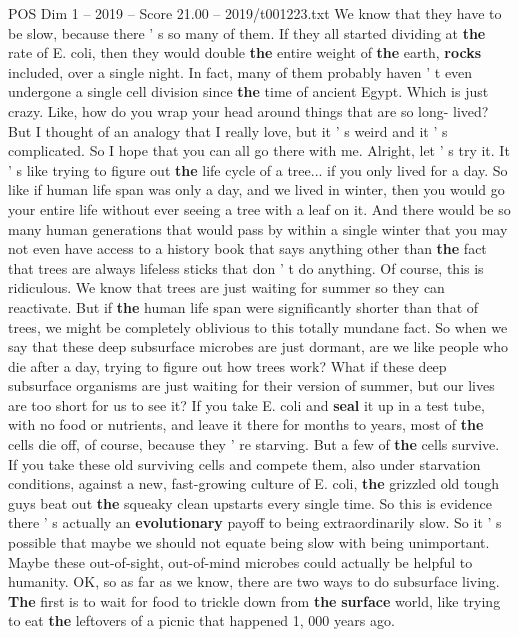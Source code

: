 \begin{textsample}{POS Dim 1 – 2019 – Score 21.00 – 2019/t001223.txt}
We know that they have to be slow, because there ' s so many of them.
If they all started dividing at \textbf{the} rate of E. coli, then they would double \textbf{the} entire weight of \textbf{the} earth, \textbf{rocks} included, over a single night.
In fact, many of them probably haven ' t even undergone a single cell division since \textbf{the} time of ancient Egypt.
Which is just crazy.
Like, how do you wrap your head around things that are so long- lived?
But I thought of an analogy that I really love, but it ' s weird and it ' s complicated.
So I hope that you can all go there with me.
Alright, let ' s try it.
It ' s like trying to figure out \textbf{the} life cycle of a tree... if you only lived for a day.
So like if human life span was only a day, and we lived in winter, then you would go your entire life without ever seeing a tree with a leaf on it.
And there would be so many human generations that would pass by within a single winter that you may not even have access to a history book that says anything other than \textbf{the} fact that trees are always lifeless sticks that don ' t do anything.
Of course, this is ridiculous.
We know that trees are just waiting for summer so they can reactivate.
But if \textbf{the} human life span were significantly shorter than that of trees, we might be completely oblivious to this totally mundane fact.
So when we say that these deep subsurface microbes are just dormant, are we like people who die after a day, trying to figure out how trees work?
What if these deep subsurface organisms are just waiting for their version of summer, but our lives are too short for us to see it?
If you take E. coli and \textbf{seal} it up in a test tube, with no food or nutrients, and leave it there for months to years, most of \textbf{the} cells die off, of course, because they ' re starving.
But a few of \textbf{the} cells survive.
If you take these old surviving cells and compete them, also under starvation conditions, against a new, fast-growing culture of E. coli, \textbf{the} grizzled old tough guys beat out \textbf{the} squeaky clean upstarts every single time.
So this is evidence there ' s actually an \textbf{evolutionary} payoff to being extraordinarily slow.
So it ' s possible that maybe we should not equate being slow with being unimportant.
Maybe these out-of-sight, out-of-mind microbes could actually be helpful to humanity.
OK, so as far as we know, there are two ways to do subsurface living. \textbf{The} first is to wait for food to trickle down from \textbf{the} \textbf{surface} world, like trying to eat \textbf{the} leftovers of a picnic that happened 1, 000 years ago.

\end{textsample}
